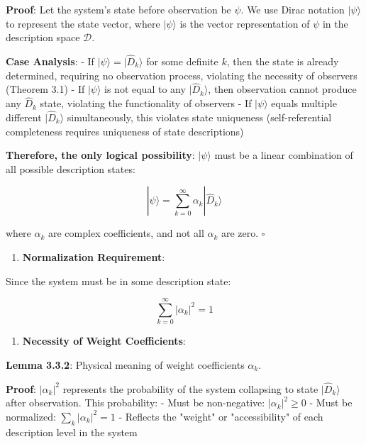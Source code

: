    \textbf{Proof}: Let the system's state before observation be $\psi$. We use Dirac notation $|\psi\rangle$ to represent the state vector, where $|\psi\rangle$ is the vector representation of $\psi$ in the description space $\mathcal{D}$.
   
   \textbf{Case Analysis}:
   - If $|\psi\rangle = |\hat{D}_k\rangle$ for some definite $k$, then the state is already determined, requiring no observation process, violating the necessity of observers (Theorem 3.1)
   - If $|\psi\rangle$ is not equal to any $|\hat{D}_k\rangle$, then observation cannot produce any $\hat{D}_k$ state, violating the functionality of observers
   - If $|\psi\rangle$ equals multiple different $|\hat{D}_k\rangle$ simultaneously, this violates state uniqueness (self-referential completeness requires uniqueness of state descriptions)
   
   \textbf{Therefore, the only logical possibility}: $|\psi\rangle$ must be a linear combination of all possible description states:
   
\begin{equation}
|\psi\rangle = \sum_{k=0}^{\infty} \alpha_k |\hat{D}_k\rangle
\end{equation}
   
   where $\alpha_k$ are complex coefficients, and not all $\alpha_k$ are zero. $\square$

\begin{enumerate}
\item \textbf{Normalization Requirement}:
\end{enumerate}
   Since the system must be in some description state:
   
\begin{equation}
\sum_{k=0}^{\infty} |\alpha_k|^2 = 1
\end{equation}

\begin{enumerate}
\item \textbf{Necessity of Weight Coefficients}:
\end{enumerate}
   \textbf{Lemma 3.3.2}: Physical meaning of weight coefficients $\alpha_k$.
\label{lemma:3.3.2}
   
   \textbf{Proof}: $|\alpha_k|^2$ represents the probability of the system collapsing to state $|\hat{D}_k\rangle$ after observation. This probability:
   - Must be non-negative: $|\alpha_k|^2 \geq 0$
   - Must be normalized: $\sum_k |\alpha_k|^2 = 1$
   - Reflects the "weight" or "accessibility" of each description level in the system
   
